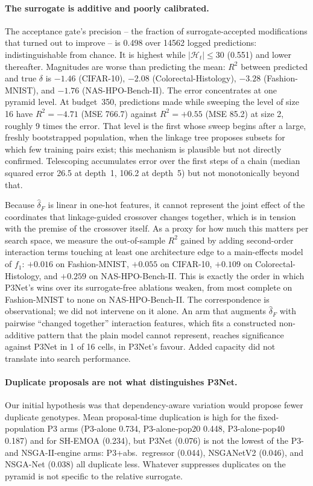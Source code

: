 \paragraph{The surrogate is additive and poorly calibrated.} The acceptance gate's precision -- the fraction of
surrogate-accepted modifications that turned out to improve -- is 0.498 over 14562 logged predictions:
indistinguishable from chance. It is highest while $|\mathcal{H}_t| \leq 30$ (0.551) and lower thereafter.
Magnitudes are worse than predicting the mean: $R^2$ between predicted and true $\delta$ is $-1.46$ (CIFAR-10),
$-2.08$ (Colorectal-Histology), $-3.28$ (Fashion-MNIST), and $-1.76$ (NAS-HPO-Bench-II). The error concentrates
at one pyramid level. At budget~350, predictions made while sweeping the level of size 16 have
$R^2=-4.71$ (MSE 766.7) against $R^2=+0.55$ (MSE 85.2) at size 2, roughly 9 times the error. That level is the
first whose sweep begins after a large, freshly bootstrapped population, when the linkage tree proposes subsets
for which few training pairs exist; this mechanism is plausible but not directly confirmed. Telescoping
accumulates error over the first steps of a chain (median squared error 26.5 at depth~1, 106.2 at depth~5) but
not monotonically beyond that.

Because $\hat\delta_F$ is linear in one-hot features, it cannot represent the joint effect of the coordinates
that linkage-guided crossover changes together, which is in tension with the premise of the crossover itself. As a
proxy for how much this matters per search space, we measure the out-of-sample $R^2$ gained by adding second-order
interaction terms touching at least one architecture edge to a main-effects model of $f_1$: $+0.016$ on
Fashion-MNIST, $+0.055$ on CIFAR-10, $+0.109$ on Colorectal-Histology, and $+0.259$ on NAS-HPO-Bench-II. This is
exactly the order in which P3Net's wins over its surrogate-free ablations weaken, from most complete on
Fashion-MNIST to none on NAS-HPO-Bench-II. The correspondence is observational; we did not intervene on it alone.
An arm that augments $\hat\delta_F$ with pairwise ``changed together'' interaction features, which fits a
constructed non-additive pattern that the plain model cannot represent, reaches significance against P3Net in 1
of 16 cells, in P3Net's favour. Added capacity did not translate into search performance.

\paragraph{Duplicate proposals are not what distinguishes P3Net.} Our initial hypothesis was that
dependency-aware variation would propose fewer duplicate genotypes. Mean proposal-time duplication is high for
the fixed-population P3 arms (P3-alone 0.734, P3-alone-pop20 0.448, P3-alone-pop40 0.187) and for SH-EMOA
(0.234), but P3Net (0.076) is not the lowest of the P3- and NSGA-II-engine arms: P3+abs.\ regressor (0.044),
NSGANetV2 (0.046), and NSGA-Net (0.038) all duplicate less. Whatever suppresses duplicates on the pyramid is not
specific to the relative surrogate.

